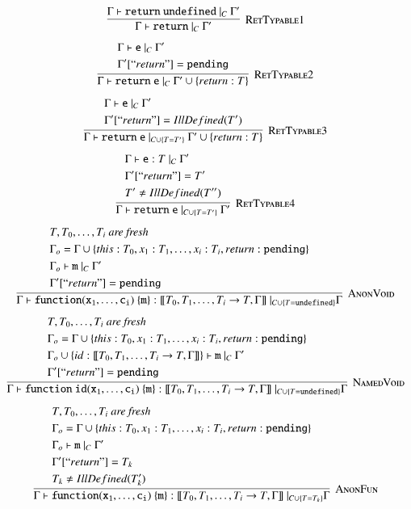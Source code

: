 \documentclass[12pt,a4paper,twoside,openright]{report}
\theoremstyle{definition}
\theoremstyle{dotless}
\begin{document}
$$\infer[\textsc{RetTypable1}]{
  \Gamma \vdash \mathtt{return}\ |_C\ \Gamma'
}{
  \Gamma \vdash \mathtt{return\ undefined}\ |_C\ \Gamma'
}$$
$$\infer[\textsc{RetTypable2}]{
  \Gamma \vdash \mathtt{return\ e}\ |_C\ \Gamma'\cup\{return: T\}
}{
  \begin{split}
	&\Gamma \vdash \mathtt{e}\ |_C\ \Gamma'\\
	&\Gamma'[``return"] = \mathtt{pending}
  \end{split}
}$$
$$\infer[\textsc{RetTypable3}]{
  \Gamma \vdash \mathtt{return\ e}\ |_{C\cup\{T=T'\}}\ \Gamma'\cup\{return: T\}
}{
  \begin{split}
	&\Gamma \vdash \mathtt{e}\ |_C\ \Gamma'\\
	&\Gamma'[``return"] = IllDefined(T')
  \end{split}
}$$
$$\infer[\textsc{RetTypable4}]{
  \Gamma \vdash \mathtt{return\ e}\ |_{C\cup\{T=T'\}}\ \Gamma'
}{
  \begin{split}
	&\Gamma \vdash \mathtt{e}:T\ |_C\ \Gamma'\\
	&\Gamma'[``return"] = T'\\
	&T'\not=IllDefined(T'')
  \end{split}
}$$
$$\infer[\textsc{AnonVoid}]{
  \Gamma\vdash\mathtt{function(x_1, \dots, c_i)\ \{m\}}:[\![T_0, T_1, \dots, T_i\rightarrow T, \Gamma]\!]\ |_{C\cup \{T=\mathtt{undefined}\}} \Gamma
}{
  \begin{split}
	&T, T_0, \dots, T_i\textit{ are fresh} \\
  	&\Gamma_o = \Gamma\cup\{this:T_0, x_1:T_1, \dots, x_i:T_i, return: \mathtt{pending}\} \\ 
  	&\Gamma_o \vdash \mathtt{m}\ |_C\ \Gamma'\\
  	&\Gamma'[``return"] = \mathtt{pending}
  \end{split}
}$$
$$\infer[\textsc{NamedVoid}]{
  \Gamma\vdash\mathtt{function\ id(x_1, \dots, c_i)\ \{m\}}:[\![T_0, T_1, \dots, T_i\rightarrow T, \Gamma]\!]\ |_{C\cup \{T=\mathtt{undefined}\}} \Gamma
}{
  \begin{split}
	&T, T_0, \dots, T_i\textit{ are fresh} \\
  	&\Gamma_o = \Gamma\cup\{this:T_0, x_1:T_1, \dots, x_i:T_i, return: \mathtt{pending}\} \\ 
	& \Gamma_o\cup \{ id: [\![T_0, T_1, \dots, T_i\rightarrow T, \Gamma]\!]\} \vdash \mathtt{m}\ |_C\ \Gamma'\\
  	&\Gamma'[``return"] = \mathtt{pending}
  \end{split}
}$$
$$\infer[\textsc{AnonFun}]{
  \Gamma\vdash\mathtt{function(x_1, \dots, c_i)\ \{m\}}:[\![T_0, T_1, \dots, T_i\rightarrow T, \Gamma]\!]\ |_{C\cup \{T=T_k\}} \Gamma
}{
  \begin{split}
	&T, T_0, \dots, T_i\textit{ are fresh} \\
  	&\Gamma_o = \Gamma\cup\{this:T_0, x_1:T_1, \dots, x_i:T_i, return: \mathtt{pending}\} \\ 
  	&\Gamma_o \vdash \mathtt{m}\ |_C\ \Gamma'\\
  	&\Gamma'[``return"] = T_k \\
	&T_k \neq IllDefined(T_k')
  \end{split}
}$$
\end{document}
